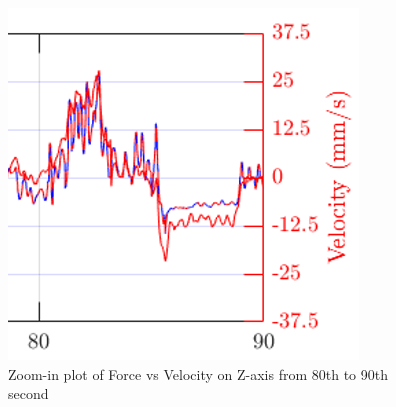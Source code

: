 \begin{figure}[htbp]
\begin{center}
\includegraphics[width=0.6\linewidth]{Images/exp/zoom_in.png}
\caption{Zoom-in plot of Force vs Velocity on Z-axis from 80th to 90th second}
\label{fig: zoom_in}
\end{center}
\end{figure}


